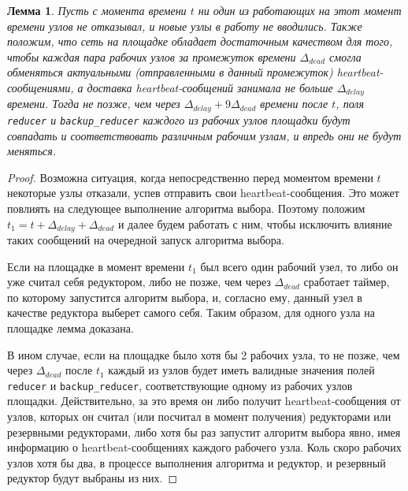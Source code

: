 \documentclass{article}
\theoremstyle{plain}
\theoremstyle{plain}
\theoremstyle{plain}
\newtheorem{lemma}{Лемма}[section]
\theoremstyle{plain}
\theoremstyle{definition}
\theoremstyle{remark}
\theoremstyle{plain}
\begin{document}
\begin{lemma}
\label{ElectionLiveness}
    Пусть с момента времени $t$ ни один из работающих на этот момент времени узлов не отказывал, и новые узлы в работу не вводились. Также положим, что сеть на площадке обладает достаточным качеством для того, чтобы каждая пара рабочих узлов за промежуток времени $\Delta_{dead}$ смогла обменяться актуальными (отправленными в данный промежуток) heartbeat-со\-об\-ще\-ниями, а доставка heartbeat-со\-об\-ще\-ний занимала не больше $\Delta_{delay}$ времени. Тогда не позже, чем через $\Delta_{delay} + 9\Delta_{dead}$ времени после $t$, поля \texttt{reducer} и \texttt{backup\_reducer} каждого из рабочих узлов площадки будут совпадать и соответствовать различным рабочим узлам, и впредь они не будут меняться.
\end{lemma}
\begin{proof}
    Возможна ситуация, когда непосредственно перед моментом времени $t$ некоторые узлы отказали, успев отправить свои heartbeat-со\-об\-ще\-ния. Это может повлиять на следующее выполнение алгоритма выбора. Поэтому положим $t_1 = t + \Delta_{delay} + \Delta_{dead}$ и далее будем работать с ним, чтобы исключить влияние таких сообщений на очередной запуск алгоритма выбора.

    Если на площадке в момент времени $t_1$ был всего один рабочий узел, то либо он уже считал себя редуктором, либо не позже, чем через $\Delta_{dead}$ сработает таймер, по которому запустится алгоритм выбора, и, согласно ему, данный узел в качестве редуктора выберет самого себя. Таким образом, для одного узла на площадке лемма доказана.
    
    В ином случае, если на площадке было хотя бы 2 рабочих узла, то не позже, чем через $\Delta_{dead}$ после $t_1$ каждый из узлов будет иметь валидные значения полей \texttt{reducer} и \texttt{backup\_reducer}, соответствующие одному из рабочих узлов площадки. Действительно, за это время он либо получит heartbeat-со\-об\-ще\-ния от узлов, которых он считал (или посчитал в момент получения) редукторами или резервными редукторами, либо хотя бы раз запустит алгоритм выбора явно, имея информацию о heartbeat-со\-об\-ще\-ниях каждого рабочего узла. Коль скоро рабочих узлов хотя бы два, в процессе выполнения алгоритма и редуктор, и резервный редуктор будут выбраны из них.
    

\end{proof}
\end{document}
